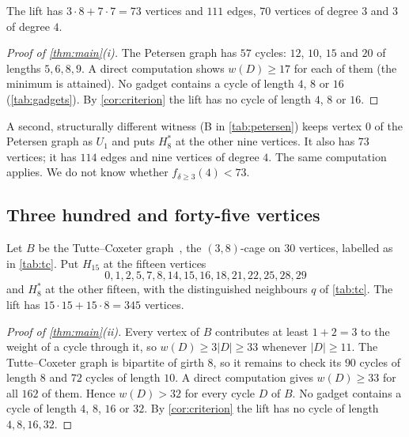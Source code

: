 \documentclass[11pt]{amsart}
\theoremstyle{definition}
\theoremstyle{remark}
\newcommand{\fd}{f_{\delta\ge 3}}
\newcommand{\Hfifteen}{H_{15}}
\newcommand{\Height}{H_8^{*}}
\begin{document}
The lift has $3\cdot 8+7\cdot 7=73$ vertices and $111$ edges, $70$ vertices of
degree $3$ and $3$ of degree $4$.

\begin{proof}[Proof of \cref{thm:main}(i)]
The Petersen graph has $57$ cycles: $12$, $10$, $15$ and $20$ of lengths
$5,6,8,9$. A direct computation shows $w(D)\ge 17$ for each of them (the minimum
is attained). No gadget contains a cycle of length $4$, $8$ or $16$
(\cref{tab:gadgets}). By \cref{cor:criterion} the lift has no cycle of length
$4$, $8$ or $16$.
\end{proof}

A second, structurally different witness (B in \cref{tab:petersen}) keeps
vertex $0$ of the Petersen graph as $U_1$ and puts $\Height$ at the other nine
vertices. It also has $73$ vertices; it has $114$ edges and nine vertices of
degree $4$. The same computation applies. We do not know whether $\fd(4)<73$.

\subsection{Three hundred and forty-five vertices}
Let $B$ be the Tutte--Coxeter graph~\cite{Tutte1947}, the $(3,8)$-cage on $30$
vertices, labelled as in \cref{tab:tc}. Put $\Hfifteen$ at the fifteen vertices
\[
0,1,2,5,7,8,14,15,16,18,21,22,25,28,29
\]
and $\Height$ at the other fifteen, with the distinguished neighbours $q$ of
\cref{tab:tc}. The lift has $15\cdot 15+15\cdot 8=345$ vertices.

\begin{proof}[Proof of \cref{thm:main}(ii)]
Every vertex of $B$ contributes at least $1+2=3$ to the weight of a cycle
through it, so $w(D)\ge 3|D|\ge 33$ whenever $|D|\ge 11$. The Tutte--Coxeter
graph is bipartite of girth $8$, so it remains to check its $90$ cycles of
length $8$ and $72$ cycles of length $10$. A direct computation gives $w(D)\ge 33$
for all $162$ of them. Hence $w(D)>32$ for every cycle $D$ of $B$. No gadget
contains a cycle of length $4$, $8$, $16$ or $32$. By \cref{cor:criterion} the
lift has no cycle of length $4,8,16,32$.
\end{proof}
\end{document}
